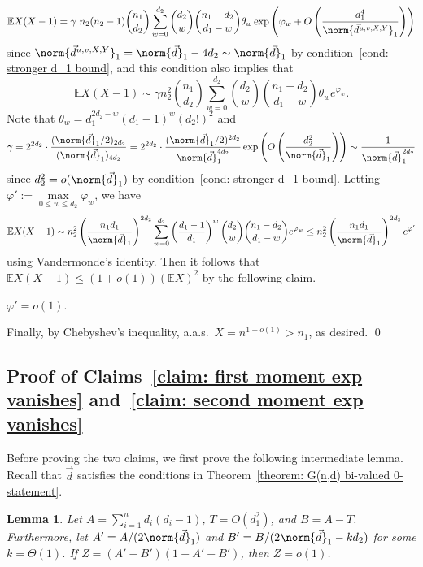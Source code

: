 \documentclass[12pt]{article}
\newtheorem{lemma}[theorem]{Lemma}
\def\ex{{\mathbb E}}
\begin{document}
\[
\ex{X(X-1)} = \gamma\ n_2(n_2-1)\binom{n_1}{d_2}\sum\limits_{w = 0}^{d_2} \binom{d_2}{w}\binom{n_1-d_2}{d_1-w} \theta_w\exp\left(\varphi_w + O\left(\frac{d_1^4}{\norm{\vec{d}^{u,v,X,Y}}_1}\right)\right)
\]
since $\norm{\vec{d}^{u,v,X,Y}}_1 = \norm{\vec{d}}_1-4d_2\sim\norm{\vec{d}}_1$ by condition~\ref{cond: stronger d_1 bound}, and this condition also implies that
\[
\ex{X(X-1)}\sim\gamma n_2^2\binom{n_1}{d_2}\sum\limits_{w = 0}^{d_2} \binom{d_2}{w}\binom{n_1-d_2}{d_1-w} \theta_w e^{\varphi_w}.
\]
Note that $\theta_w = d_1^{2d_2-w} (d_1-1)^w (d_2!)^2$ and
\[
\gamma = 2^{2d_2}\cdot \frac{(\norm{\vec{d}}_1/2)_{2d_2}}{(\norm{\vec{d}}_1)_{4d_2}} = 2^{2d_2}\cdot\frac{(\norm{\vec{d}}_1/2)^{2d_2}}{\norm{\vec{d}}_1^{4d_2}}\exp\left(O\left(\frac{d_2^2}{\norm{\vec{d}}_1}\right)\right)\sim\frac{1}{\norm{\vec{d}}_1^{2d_2}}
\]
since $d_2^2 = o(\norm{\vec{d}}_1)$ by condition~\ref{cond: stronger d_1 bound}. Letting $\varphi':= \max\limits_{0\leq w\leq d_2} \varphi_w$, we have
\[
\ex{X(X-1)}\sim n_2^2\left(\frac{n_1 d_1}{\norm{\vec{d}}_1}\right)^{2d_2}\sum\limits_{w = 0}^{d_2} \left(\frac{d_1-1}{d_1}\right)^w\binom{d_2}{w}\binom{n_1-d_2}{d_1-w} e^{\varphi_w}\leq n_2^2\left(\frac{n_1 d_1}{\norm{\vec{d}}_1}\right)^{2d_2} e^{\varphi'}
\]
using Vandermonde's identity. Then it follows that $\ex{X(X-1)}\leq (1+o(1))(\ex{X})^2$ by the following claim.

\begin{claim}
\label{claim: second moment exp vanishes}
$\varphi' = o(1)$.
\end{claim}

\noindent Finally, by Chebyshev's inequality, a.a.s.\ $X = n^{1-o(1)} > n_1$, as desired.
\qed

\subsection{Proof of Claims~\ref{claim: first moment exp vanishes} and~\ref{claim: second moment exp vanishes}}

Before proving the two claims, we first prove the following intermediate lemma. Recall that $\vec{d}$ satisfies the conditions in Theorem~\ref{theorem: G(n,d) bi-valued 0-statement}.

\begin{lemma}
\label{lemma: G(n,d) 0-statement Intermediate Lemma}
Let $A = \sum\limits_{i = 1}^{n} d_i(d_i-1)$, $T= O(d_1^2)$, and $B = A - T$. Furthermore, let $A' = A/(2\norm{\vec{d}}_1)$ and $B' = B/(2\norm{\vec{d}}_1 - k d_2)$ for some $k = \Theta(1)$. If $Z = (A' - B')(1 + A' + B')$, then $Z = o(1)$.
\end{lemma}
\end{document}
